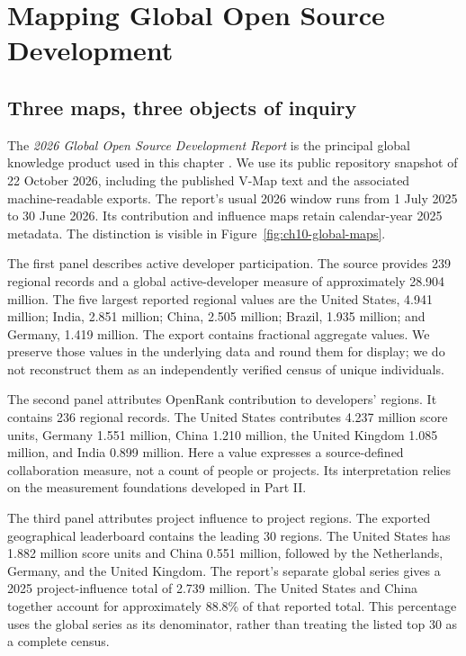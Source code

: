 \section{Mapping Global Open Source Development}
\label{sec:ch10-global}

\subsection{Three maps, three objects of inquiry}
The \emph{2026 Global Open Source Development Report} is the principal global knowledge product used in this chapter \citep{gosd2026}. We use its public repository snapshot of 22 October 2026, including the published V-Map text and the associated machine-readable exports. The report's usual 2026 window runs from 1 July 2025 to 30 June 2026. Its contribution and influence maps retain calendar-year 2025 metadata. The distinction is visible in Figure~\ref{fig:ch10-global-maps}.

The first panel describes active developer participation. The source provides 239 regional records and a global active-developer measure of approximately 28.904 million. The five largest reported regional values are the United States, 4.941 million; India, 2.851 million; China, 2.505 million; Brazil, 1.935 million; and Germany, 1.419 million. The export contains fractional aggregate values. We preserve those values in the underlying data and round them for display; we do not reconstruct them as an independently verified census of unique individuals.

The second panel attributes OpenRank contribution to developers' regions. It contains 236 regional records. The United States contributes 4.237 million score units, Germany 1.551 million, China 1.210 million, the United Kingdom 1.085 million, and India 0.899 million. Here a value expresses a source-defined collaboration measure, not a count of people or projects. Its interpretation relies on the measurement foundations developed in Part II.

The third panel attributes project influence to project regions. The exported geographical leaderboard contains the leading 30 regions. The United States has 1.882 million score units and China 0.551 million, followed by the Netherlands, Germany, and the United Kingdom. The report's separate global series gives a 2025 project-influence total of 2.739 million. The United States and China together account for approximately 88.8\% of that reported total. This percentage uses the global series as its denominator, rather than treating the listed top 30 as a complete census.

